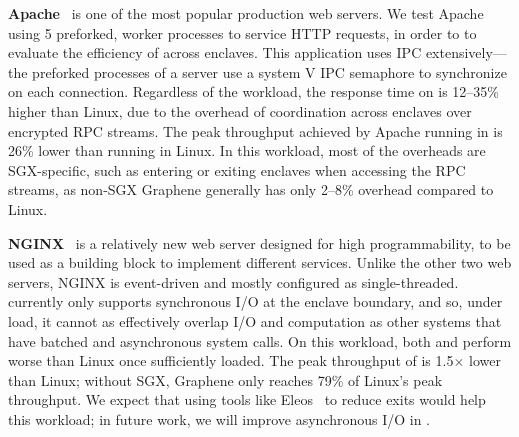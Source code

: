 

{\bf Apache}~\cite{apache} is one of the most popular production web servers. We test Apache using 5 preforked, worker processes to service HTTP requests,
in order to 
to evaluate the efficiency of \graphenesgx{} across enclaves.
This application uses IPC extensively---the preforked processes of a server use a system V IPC semaphore to synchronize on each connection.
Regardless of the workload, the response time on \graphenesgx{} is 12--35\% higher than Linux, due to the overhead of coordination across enclaves over encrypted RPC streams.
The peak throughput achieved by Apache running in \graphenesgx{} is 26\% lower than running in Linux.
In this workload, most of the overheads are SGX-specific, such as entering or exiting enclaves when accessing the RPC streams, as non-SGX Graphene
generally has only 2--8\% overhead compared to Linux.



{\bf NGINX}~\cite{nginx} is a relatively new web server designed for high programmability, to be used as a building block to implement different services.
Unlike the other two web servers, NGINX is event-driven and mostly configured as single-threaded.
\graphenesgx{} currently only supports synchronous I/O at the enclave boundary,
and so, under load, it cannot as effectively overlap I/O and computation
as other systems that have batched and asynchronous system calls.
On this workload, both \graphene{} and \graphenesgx{} 
perform worse than Linux once sufficiently loaded.
The peak throughput of \graphenesgx{} is 1.5$\times$ lower than Linux;
without SGX, Graphene only reaches 79\% of Linux's peak throughput.
We expect that using tools like Eleos~\cite{orenbach17eleos} to reduce exits
would help this workload; in future work, we will improve
asynchronous I/O in \graphenesgx{}.

